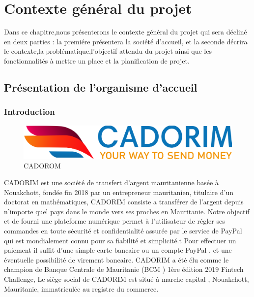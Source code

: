 \chapter{Contexte général du projet}
Dans ce chapitre,nous présenterons le contexte général du projet qui sera décliné en deux parties : la premiére présentera la société d'accueil, et la seconde décrira le contexte,la  problématique,l'objectif attendu du projet ainsi que les fonctionnalités à mettre un place et la  planification de projet.                                                                                                                                                                                                                                                                                                                                                                                                                                                                                                                                                                                                                                                                                                                                                                                                                                                                                                          
\label{chap:introduction}
\section{Présentation de l'organisme d'accueil}
\subsection{Introduction}
\begin{figure}[h]
	\includegraphics[scale=0.14]{./Template LaTeX/Images/cado_logo.png}
	\centering
	\caption{CADOROM}
\end{figure}
CADORIM est une société de transfert d’argent mauritanienne basée à Nouakchott,
fondée fin 2018 par un entrepreneur mauritanien, titulaire d'un doctorat en
mathématiques,
CADORIM consiste a transférer de l’argent depuis n’importe quel pays dans le
monde vers ses proches en Mauritanie. Notre objectif et de fourni une plateforme
numérique permet à l’utilisateur de régler ses commandes en toute sécurité et
confidentialité assurée par le service de PayPal qui est mondialement connu pour sa
fiabilité et simplicité.t Pour effectuer un paiement il suffit d'une simple carte bancaire
ou un compte PayPal . et une éventuelle possibilité de virement bancaire.
CADORIM a été élu comme le champion de Banque Centrale de Mauritanie (BCM )
1ère édition 2019 Fintech Challenge,
Le siège social de CADORIM est situé à marche capital , Nouakchott, Mauritanie,
immatriculée au registre du commerce.
